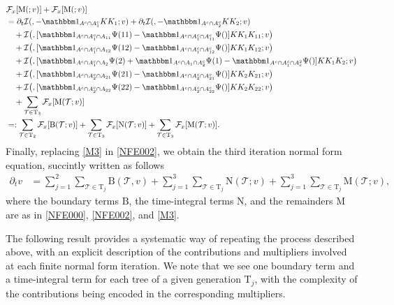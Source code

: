\documentclass[%
11pt,  reqno]{amsart}
\makeatletter
\newcommand{\5}{\textup{V}}
\newcommand{\ind}{\mathbbm 1}
\newcommand{\dt}{\partial_t}
\theoremstyle{remark}
\newcommand{\TT}{\mathcal{T}}
\newcommand{\Tr}{\mathrm{T}}
\newcommand{\Ft}{{\mathcal{F}}}
\def\<#1>{\csname MH@symb@#1\endcsname}
\newcommand{\Ical}{\mathcal{I}}
\numberwithin{equation}{section}
\numberwithin{theorem}{section}
\newcommand{\MM}{\mathrm{M}}
\newcommand{\NN}{\mathrm{N}}
\newcommand{\BB}{\mathrm{B}}
\makeatother
\begin{document}
\begin{align}
&
 \Ft_x[ 
\MM(\<21>;v)
] 
+
 \Ft_x[ 
\MM(\<22>;v)
] 
\\
&
=
\dt \Ical(\<21>, - \ind_{A^c \cap A_1^c} KK_1 ; v) 
+
\dt\Ical(\<22>, - \ind_{A^c \cap A_2^c} KK_2 ; v) 
\\
&
\quad 
+ \Ical\big( \<31> ,  [\ind_{A^c\cap A_1^c \cap A_{11}} \Psi(11) - \ind_{A^c\cap A_1^c \cap A_{11}^c} \Psi(\<21>) ] KK_1 K_{11}  ; v \big)
\\
&
\quad 
+
 \Ical\big( \<32> , [ \ind_{A^c\cap A_1^c \cap A_{12}} \Psi(12) - \ind_{A^c \cap A_1^c \cap A_{12}^c} \Psi(\<21>)  ]KK_1 K_{12}  ; v \big)
\\
&
\quad 
+ \Ical\big( \<33> ,  [ \ind_{A^c\cap A_1^c \cap A_{2}} \Psi(2)+ \ind_{A^c \cap A_1 \cap A_2^c} \Psi(1)  - \ind_{A^c \cap A_1^c \cap A^2_c} \Psi(\<1>)] KK_1 K_2    ; v \big)
\\
&
\quad 
+ \Ical\big( \<34> , [ \ind_{A^c \cap A_2^c \cap A_{21}} \Psi(21) - \ind_{A^c \cap A_2^c \cap A_{21}^c} \Psi(\<22>) ]K K_2 K_{21}  ; v \big)
\\
&
\quad 
+ \Ical\big( \<35> ,[ \ind_{A^c \cap A_2^c \cap A_{22} } \Psi(22) - \ind_{A^c \cap A_2^c \cap A_{22}^c} \Psi(\<22>) ] K K_2 K_{22}    ; v \big)
\\
&
\quad 
+ \sum_{\TT\in\Tr_3} 
 \Ft_x[ 
\MM(\TT;v)
] 
\\
&
=: 
\sum_{\TT\in \Tr_2}  
\Ft_x[ 
\BB(\TT;v)
] 
 + \sum_{\TT \in \Tr_3} 
 \Ft_x[ 
\NN(\TT;v)
] 
 + \sum_{\TT\in\Tr_3} 
 \Ft_x[ 
\MM(\TT;v)
] 
. 
\label{M3}
\end{align}
Finally, replacing \eqref{M3} in \eqref{NFE002}, we obtain the third iteration normal form equation, succintly written as follows
\begin{align}
\dt v
&
= \sum_{j=1}^2 \sum_{\TT \in \Tr_j} \BB(\TT,v) 
+ 
\sum_{j=1}^3 \sum_{\TT\in \Tr_j} \NN(\TT; v) 
+
\sum_{j=1}^3 \sum_{\TT\in \Tr_j} \MM(\TT; v), 
\end{align}
where the boundary terms $\BB$, the time-integral terms $\NN$, and the remainders $\MM$ are as in \eqref{NFE000}, \eqref{NFE002}, and \eqref{M3}. 





The following result provides a systematic way of repeating the process described above, with an explicit description of the contributions and multipliers involved at each finite normal form iteration. 
We note that we see one boundary term and a time-integral term for each tree of a given generation $\Tr_j$, with the complexity of the contributions being encoded in the corresponding multipliers.
\end{document}
